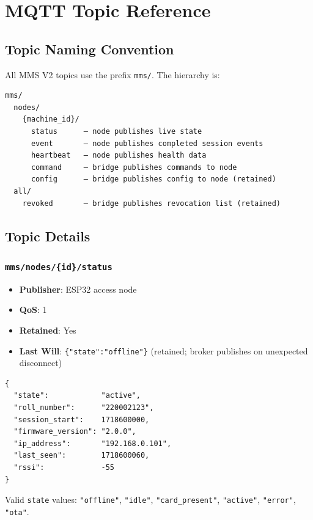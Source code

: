 \chapter{MQTT Topic Reference}
\label{app:mqtt_reference}

\section{Topic Naming Convention}

All MMS V2 topics use the prefix \texttt{mms/}. The hierarchy is:
\begin{verbatim}
mms/
  nodes/
    {machine_id}/
      status      — node publishes live state
      event       — node publishes completed session events
      heartbeat   — node publishes health data
      command     — bridge publishes commands to node
      config      — bridge publishes config to node (retained)
  all/
    revoked       — bridge publishes revocation list (retained)
\end{verbatim}

\section{Topic Details}

\subsection{\texttt{mms/nodes/\{id\}/status}}
\begin{itemize}[leftmargin=1.5em,noitemsep]
    \item \textbf{Publisher}: ESP32 access node
    \item \textbf{QoS}: 1
    \item \textbf{Retained}: Yes
    \item \textbf{Last Will}: \texttt{\{"state":"offline"\}} (retained; broker publishes on unexpected disconnect)
\end{itemize}

\begin{lstlisting}[style=jsonlstyle,caption={Status topic payload}]
{
  "state":            "active",
  "roll_number":      "220002123",
  "session_start":    1718600000,
  "firmware_version": "2.0.0",
  "ip_address":       "192.168.0.101",
  "last_seen":        1718600060,
  "rssi":             -55
}
\end{lstlisting}

Valid \texttt{state} values: \texttt{"offline"}, \texttt{"idle"}, \texttt{"card\_present"}, \texttt{"active"}, \texttt{"error"}, \texttt{"ota"}.

